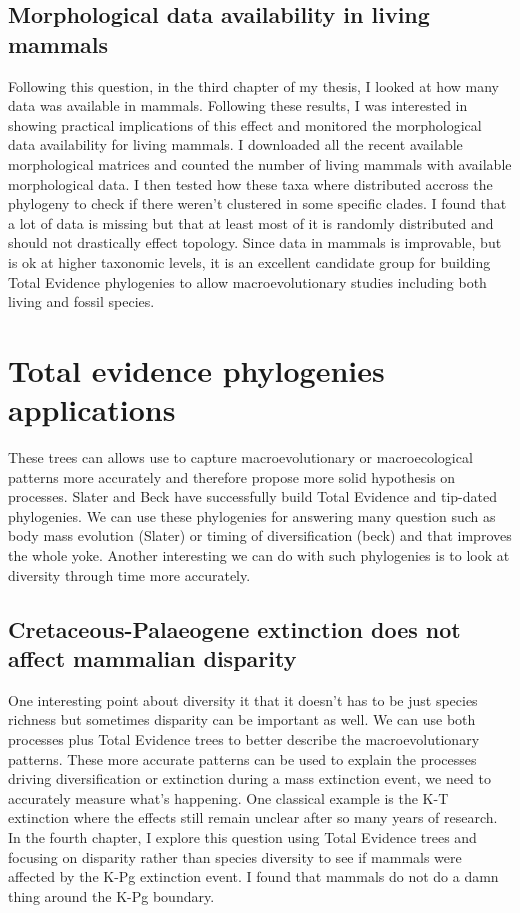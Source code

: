 \subsection{Morphological data availability in living mammals}
Following this question, in the third chapter of my thesis, I looked at how many data was available in mammals.
Following these results, I was interested in showing practical implications of this effect and monitored the morphological data availability for living mammals.
I downloaded all the recent available morphological matrices and counted the number of living mammals with available morphological data.
I then tested how these taxa where distributed accross the phylogeny to check if there weren't clustered in some specific clades.
I found that a lot of data is missing but that at least most of it is randomly distributed and should not drastically effect topology.
Since data in mammals is improvable, but is ok at higher taxonomic levels, it is an excellent candidate group for building Total Evidence phylogenies to allow macroevolutionary studies including both living and fossil species.

\section{Total evidence phylogenies applications}
These trees can allows use to capture macroevolutionary or macroecological patterns more accurately and therefore propose more solid hypothesis on processes.
Slater and Beck have successfully build Total Evidence and tip-dated phylogenies.
We can use these phylogenies for answering many question such as body mass evolution (Slater) or timing of diversification (beck) and that improves the whole yoke.
Another interesting we can do with such phylogenies is to look at diversity through time more accurately.

\subsection{Cretaceous-Palaeogene extinction does not affect mammalian disparity}
One interesting point about diversity it that it doesn't has to be just species richness but sometimes disparity can be important as well.
We can use both processes plus Total Evidence trees to better describe the macroevolutionary patterns.
These more accurate patterns can be used to explain the processes driving diversification or extinction during a mass extinction event, we need to accurately measure what's happening.
One classical example is the K-T extinction where the effects still remain unclear after so many years of research.
In the fourth chapter, I explore this question using Total Evidence trees and focusing on disparity rather than species diversity to see if mammals were affected by the K-Pg extinction event.
I found that mammals do not do a damn thing around the K-Pg boundary.

